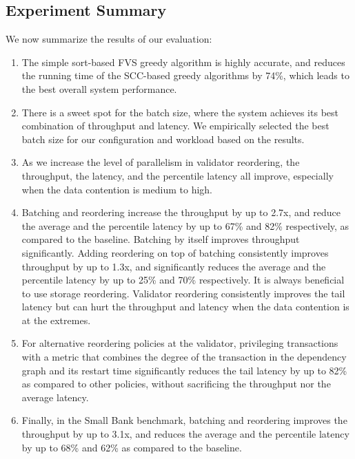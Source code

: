 \subsection{Experiment Summary}

We now summarize the results of our evaluation:
\begin{enumerate}[leftmargin=*]
\item The simple sort-based FVS greedy algorithm is highly accurate, and reduces the running time of the SCC-based greedy algorithms by 74\%, which leads to the best overall system performance. 
\item There is a sweet spot for the batch size, where the system achieves its best combination of throughput and latency. We empirically selected the best batch size for our configuration and workload based on the results.
\item As we increase the level of parallelism in validator reordering, the throughput, the latency, and the percentile latency all improve, especially when the data contention is medium to high.
\item Batching and reordering increase the throughput by up to 2.7x, and reduce the average and the percentile latency by up to 67\% and 82\% respectively, as compared to the baseline. Batching by itself improves throughput significantly. Adding reordering on top of batching consistently improves throughput by up to 1.3x, and significantly reduces the average and the percentile latency by up to 25\% and 70\% respectively. It is always beneficial to use storage reordering. Validator reordering consistently improves the tail latency but can hurt the throughput and latency when the data contention is at the extremes.
\item For alternative reordering policies at the validator, privileging transactions with a metric that combines the degree of the transaction in the dependency graph and its restart time significantly reduces the tail latency by up to 82\% as compared to other policies, without sacrificing the throughput nor the average latency.
\item Finally, in the Small Bank benchmark, batching and reordering improves the throughput by up to 3.1x, and reduces the average and the percentile latency by up to 68\% and 62\% as compared to the baseline.
\end{enumerate}  
